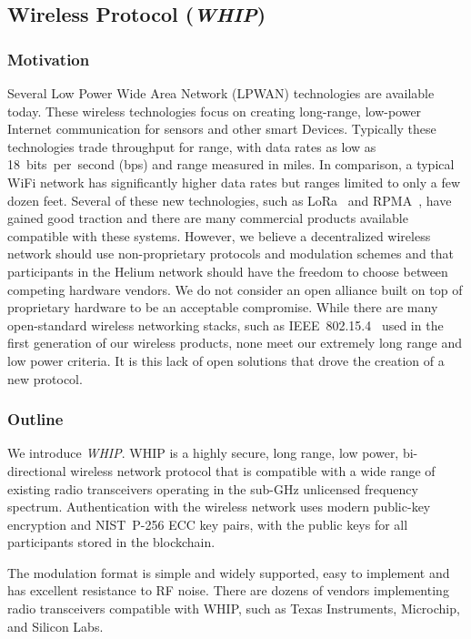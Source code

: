 \documentclass[10pt, nonatbib, nocopyrightspace, reprint]{sigplanconf}
\begin{document}
\subsection{Wireless Protocol (\emph{WHIP})}\label{whip}

\subsubsection{Motivation}

Several Low Power Wide Area Network (LPWAN) technologies are available today. These wireless technologies focus on creating long-range, low-power Internet communication for sensors and other smart Devices. Typically these technologies trade throughput for range, with data rates as low as 18~bits~per~second (bps) and range measured in miles. In comparison, a typical WiFi network has significantly higher data rates but ranges limited to only a few dozen feet. Several of these new technologies, such as LoRa~\cite{lora} and RPMA~\cite{rpma}, have gained good traction and there are many commercial products available compatible with these systems. However, we believe a decentralized wireless network should use non-proprietary protocols and modulation schemes and that participants in the Helium network should have the freedom to choose between competing hardware vendors. We do not consider an open alliance built on top of proprietary hardware to be an acceptable compromise. While there are many open-standard wireless networking stacks, such as IEEE~802.15.4~\cite{ieee802_15_4} used in the first generation of our wireless products, none meet our extremely long range and low power criteria. It is this lack of open solutions that drove the creation of a new protocol.

\subsubsection{Outline}

We introduce \emph{WHIP}. WHIP is a highly secure, long range, low power, bi-directional wireless network protocol that is compatible with a wide range of existing radio transceivers operating in the sub-GHz unlicensed frequency spectrum. Authentication with the wireless network uses modern public-key encryption and NIST~P-256 ECC key pairs, with the public keys for all participants stored in the blockchain.

The modulation format is simple and widely supported, easy to implement and has excellent resistance to RF noise. There are dozens of vendors implementing radio transceivers compatible with WHIP, such as Texas Instruments, Microchip, and Silicon Labs.
\end{document}
